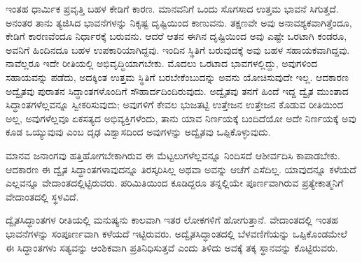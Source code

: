 \vskip 0.2cm


ಇಂತಹ ಧಾರ್ಮಿಕ ಪ್ರವೃತ್ತಿ ಬಹಳ ಕೇಡಿಗೆ ಕಾರಣ. ಮಾನವನಿಗೆ ಒಂದು ಸೊಗಸಾದ ಉತ್ತಮ ಭಾವನೆ ಸಿಗುತ್ತದೆ. ಅನಂತರ ತಾನು ತ್ಯಜಿಸಿದ ಭಾವನೆಗಳನ್ನು ನಿಕೃಷ್ಟ ದೃಷ್ಟಿಯಿಂದ ಕಾಣುವನು. ತಕ್ಷಣವೇ ಅವು ಅನಾವಶ್ಯಕವಾಗಿತ್ತೆಂದೂ, ಕೇಡಿಗೆ ಕಾರಣವೆಂದೂ ನಿರ್ಧಾರಕ್ಕೆ ಬರುವನು. ಆದರೆ ಆತನ ಈಗಿನ ದೃಷ್ಟಿಯಿಂದ ಅವು ಎಷ್ಟೇ ಒರಟಾಗಿ ಕಂಡರೂ, ಅವನಿಗೆ ಹಿಂದಿನದೂ ಬಹಳ ಉಪಕಾರಿಯಾಗಿದ್ದವು. ಇಂದಿನ ಸ್ಥಿತಿಗೆ ಬರುವುದಕ್ಕೆ ಅವು ಬಹಳ ಸಹಾಯಕವಾಗಿದ್ದವು. ನಾವೆಲ್ಲರೂ ಇದೇ ರೀತಿಯಲ್ಲಿ ಅಭಿವೃದ್ಧಿಯಾಗಬೇಕು. ಮೊದಲು ಒರಟಾದ ಭಾವಗಳಲ್ಲಿದ್ದು, ಅವುಗಳಿಂದ ಸಹಾಯವನ್ನು ಪಡೆದು, ಅದಕ್ಕಿಂತ ಉತ್ತಮ ಸ್ಥಿತಿಗೆ ಬರಬೇಕೆಂಬುದನ್ನು ಅವನು ಯೋಚಿಸುವುದೇ ಇಲ್ಲ. ಆದಕಾರಣ ಅದ್ವೈತವು ಪುರಾತನ ಸಿದ್ಧಾಂತಗಳೊಂದಿಗೆ ಸೌಹಾರ್ದದಿಂದಿರುವುದು. ಅದ್ವೈತವು ತನಗೆ ಹಿಂದೆ ಇದ್ದ ದ್ವೈತ ಮುಂತಾದ ಸಿದ್ಧಾಂತಗಳೆಲ್ಲವನ್ನೂ ಸ್ವೀಕರಿಸುವುದು; ಅವುಗಳಿಗೆ ಕೇವಲ ಭುಜತಟ್ಟಿ ಉತ್ತೇಜನ ಉತ್ತೇಜನ ಕೊಡುವ ರೀತಿಯಿಂದ ಅಲ್ಲ, ಅವುಗಳೆಲ್ಲವೂ ಏಕಸತ್ಯದ ಅಭಿವ್ಯಕ್ತಿಗಳೆಂದು, ತಾನು ಯಾವ ನಿರ್ಣಯಕ್ಕೆ ಬಂದಿದೆಯೋ ಅದೇ ನಿರ್ಣಯಕ್ಕೆ ಅವು ಕೂಡ ಒಯ್ಯುವುವು ಎಂಬ ದೃಢ ವಿಶ್ವಾಸದಿಂದ ಅವುಗಳನ್ನು ಅದ್ವೈತವು ಒಪ್ಪಿಕೊಳ್ಳುವುದು. 

ಮಾನವ ಜನಾಂಗವು ಹತ್ತಿಹೋಗಬೇಕಾಗಿರುವ ಈ ಮೆಟ್ಟಲುಗಳೆಲ್ಲವನ್ನೂ ನಿಂದಿಸದೆ ಆಶೀರ್ವದಿಸಿ ಕಾಪಾಡಬೇಕು. ಆದಕಾರಣ ಈ ದ್ವೈತ ಸಿದ್ಧಾಂತಗಳಾವುದನ್ನೂ ತಿರಸ್ಕರಿಸಿಲ್ಲ ಅಥವಾ ಅವನ್ನು ಆಚೆಗೆ ಎಸೆದಿಲ್ಲ. ಯಾವುದನ್ನೂ ಕಳೆಯದೆ ಎಲ್ಲವನ್ನೂ ವೇದಾಂತದಲ್ಲಿಟ್ಟಿರುವರು. ಪರಿಮಿತಿಯಿಂದ ಕೂಡಿದ್ದರೂ ತನ್ನಲ್ಲಿಯೇ ಪೂರ್ಣವಾಗಿರುವ ಪ್ರತ್ಯೇಕಾತ್ಮನಿಗೆ ವೇದಾಂತದಲ್ಲಿ ಸ್ಥಳವಿದೆ. 

ದ್ವೈತಸಿದ್ಧಾಂತಗಳ ರೀತಿಯಲ್ಲಿ ಮನುಷ್ಯನು ಕಾಲವಾಗಿ ಇತರ ಲೋಕಗಳಿಗೆ ಹೋಗುತ್ತಾನೆ. ವೇದಾಂತದಲ್ಲಿ ಇಂತಹ ಭಾವನೆಗಳನ್ನು ಸಂಪೂರ್ಣವಾಗಿ ಕಳೆಯದೆ ಇಟ್ಟಿರುವರು. ಅದ್ವೈತಸಿದ್ಧಾಂತದಲ್ಲಿ ಬೆಳವಣಿಗೆಯನ್ನು ಒಪ್ಪಿಕೊಂಡಮೇಲೆ ಈ ಸಿದ್ಧಾಂತಗಳು ಸತ್ಯವನ್ನು ಆಂಶಿಕವಾಗಿ ಪ್ರತಿನಿಧಿಸುತ್ತವೆ ಎಂದು ತಿಳಿದು ಅವಕ್ಕೆ ತಕ್ಕ ಸ್ಥಾನವನ್ನು ಕೊಟ್ಟಿರುವರು. 

